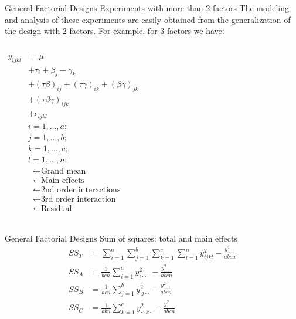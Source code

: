 \documentclass[t]{beamer}
\begin{document}

\begin{ftst}
{General Factorial Designs}
{Experiments with more than 2 factors}
The modeling and analysis of these experiments are easily obtained from the generalization of the design with 2 factors. For example, for 3 factors we have:
\begin{columns}
\begin{align*} y_{ijkl} &= \mu\\
&+ \tau_i + \beta_j + \gamma_k\\
&+(\tau\beta)_{ij} + (\tau\gamma)_{ik} + (\beta\gamma)_{jk}\\
&+ (\tau\beta\gamma)_{ijk}\\
&+ \epsilon_{ijkl}\\
&i=1,\ldots,a;\\
&j=1,\ldots,b;\\
&k=1,\ldots,c;\\
&l=1,\ldots,n;
\end{align*}
\begin{align*} &\longleftarrow\mbox{Grand mean}\\
&\longleftarrow\mbox{Main effects}\\
&\longleftarrow\mbox{2nd order interactions}\\
&\longleftarrow\mbox{3rd order interaction}\\
&\longleftarrow\mbox{Residual}\\
\end{align*}
\end{columns}
\end{ftst}


\begin{ftst}
{General Factorial Designs}
{Sum of squares: total and main effects}
\begin{align*}
SS_T &= \sum\limits_{i=1}^{a}\sum\limits_{j=1}^{b}\sum\limits_{k=1}^{c}\sum\limits_{l=1}^{n}{y_{ijkl}^2} - \frac{y_{\cdot\cdot\cdot\cdot}^2}{abcn}\\
SS_A &=\frac{1}{bcn}\sum\limits_{i=1}^{a} {y_{i\cdot\cdot\cdot}^2} - \frac{y_{\cdot\cdot\cdot\cdot}^2}{abcn}\\
SS_B &=\frac{1}{acn}\sum\limits_{j=1}^{b} {y_{\cdot j\cdot\cdot}^2} - \frac{y_{\cdot\cdot\cdot\cdot}^2}{abcn}\\
SS_C &=\frac{1}{abn}\sum\limits_{k=1}^{c} {y_{\cdot\cdot k\cdot}^2} - \frac{y_{\cdot\cdot\cdot\cdot}^2}{abcn}\\
\end{align*}
\end{ftst}
\end{document}
